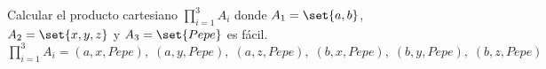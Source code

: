 \documentclass[fc]{tarea}
\begin{document}
\begin{tasks}
    \task Calcular el producto cartesiano $\prod_{i=1}^{3} A_i$ donde $A_1=\set{a, b}$,\;
    $A_2=\set{x,y,z}$ y $A_3=\set{Pepe}$ es fácil. $\prod_{i=1}^{3} A_i = (a,x,Pepe),\;
(a,y,Pepe),\;
(a,z,Pepe),\;
(b,x,Pepe),\;
(b,y,Pepe),\;
(b,z,Pepe)$ 
\end{tasks}
\end{document}
